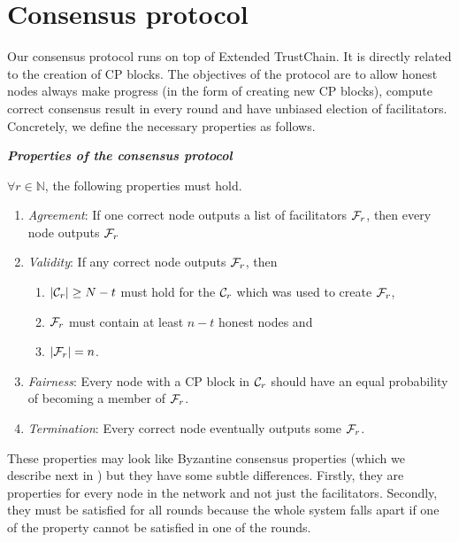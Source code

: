 

\section{Consensus protocol}
\label{sec:cons-protocol}

Our consensus protocol runs on top of Extended TrustChain.
It is directly related to the creation of CP blocks.
The objectives of the protocol are to
    allow honest nodes always make progress (in the form of creating new CP blocks),
    compute correct consensus result in every round
    and have unbiased election of facilitators.
Concretely, we define the necessary properties as follows.
\begin{definition}
\label{def:consensus}
\textbf{\emph{Properties of the consensus protocol}}

$\forall r \in \mathbb{N}$, the following properties must hold.
\begin{enumerate}
    \item \emph{Agreement}:
        If one correct node outputs a list of facilitators $\mathcal{F}_r$,
        then every node outputs $\mathcal{F}_r$
    \item \emph{Validity}:
        If any correct node outputs $\mathcal{F}_r$, then 
            \begin{enumerate}
                \item $|\mathcal{C}_r| \ge N - t$ must hold for the $\mathcal{C}_r$ which was used to create $\mathcal{F}_r$,
                \item $\mathcal{F}_r$ must contain at least $n - t$ honest nodes and
                \item $|\mathcal{F}_r| = n$.
            \end{enumerate}
    \item \emph{Fairness}:
        Every node with a CP block in $\mathcal{C}_r$ should have an equal probability of becoming a member of $\mathcal{F}_r$.
    \item \emph{Termination}:
        Every correct node eventually outputs some $\mathcal{F}_r$.
\end{enumerate}
\end{definition}
These properties may look like Byzantine consensus properties (which we describe next in ) but they have some subtle differences.
Firstly, they are properties for every node in the network and not just the facilitators.
Secondly, they must be satisfied for all rounds because the whole system falls apart if one of the property cannot be satisfied in one of the rounds.

